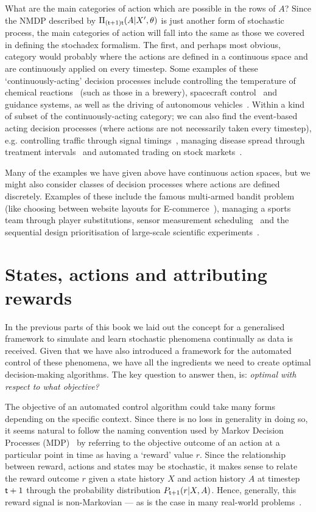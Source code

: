 What are the main categories of action which are possible in the rows of $A$? Since the NMDP described by $\Pi_{({\sf t}+1){\sf t}}(A\vert X',\theta)$ is just another form of stochastic process, the main categories of action will fall into the same as those we covered in defining the stochadex formalism. The first, and perhaps most obvious, category would probably where the actions are defined in a continuous space and are continuously applied on every timestep. Some examples of these `continuously-acting' decision processes include controlling the temperature of chemical reactions~\cite{beeler2023chemgymrl} (such as those in a brewery), spacecraft control~\cite{tipaldi2022reinforcement} and guidance systems,  as well as the driving of autonomous vehicles~\cite{kiran2021deep}. Within a kind of subset of the continuously-acting category; we can also find the event-based acting decision processes (where actions are not necessarily taken every timestep), e.g. controlling traffic through signal timings~\cite{garg2018deep}, managing disease spread through treatment intervals~\cite{ohi2020exploring} and automated trading on stock markets~\cite{meng2019reinforcement}.

Many of the examples we have given above have continuous action spaces, but we might also consider classes of decision processes where actions are defined discretely. Examples of these include the famous multi-armed bandit problem~\cite{gittins2011multi} (like choosing between website layouts for E-commerce~\cite{liu2021map}), managing a sports team through player substitutions, sensor measurement scheduling~\cite{leong2020deep} and the sequential design prioritisation of large-scale scientific experiments~\cite{blau2022optimizing}.

\section{\sffamily States, actions and attributing rewards}

In the previous parts of this book we laid out the concept for a generalised framework to simulate and learn stochastic phenomena continually as data is received. Given that we have also introduced a framework for the automated control of these phenomena, we have all the ingredients we need to create optimal decision-making algorithms. The key question to answer then, is: \emph{optimal with respect to what objective?}

The objective of an automated control algorithm could take many forms depending on the specific context. Since there is no loss in generality in doing so, it seems natural to follow the naming convention used by Markov Decision Processes (MDP)~\cite{bertsekas2011dynamic,sutton2018reinforcement} by referring to the objective outcome of an action at a particular point in time as having a `reward' value $r$. Since the relationship between reward, actions and states may be stochastic, it makes sense to relate the reward outcome $r$ given a state history $X$ and action history $A$ at timestep ${\sf t}+1$ through the probability distribution $P_{{\sf t}+1}(r\vert X,A)$. Hence, generally, this reward signal is non-Markovian --- as is the case in many real-world problems~\cite{gaon2020reinforcement}. 

